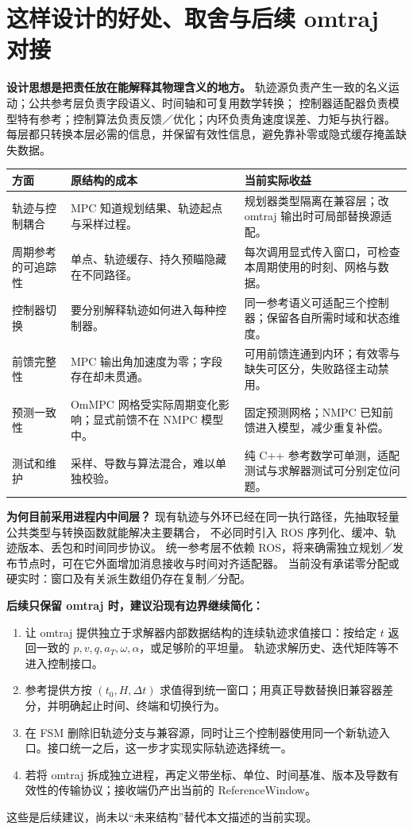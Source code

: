 \documentclass[UTF8,a4paper,11pt,fontset=fandol]{ctexart}
\begin{document}
\section{这样设计的好处、取舍与后续 omtraj 对接}
\label{sec:benefits}
\textbf{设计思想是把责任放在能解释其物理含义的地方。}
轨迹源负责产生一致的名义运动；公共参考层负责字段语义、时间轴和可复用数学转换；
控制器适配器负责模型特有参考；控制算法负责反馈／优化；内环负责角速度误差、力矩与执行器。
每层都只转换本层必需的信息，并保留有效性信息，避免靠补零或隐式缓存掩盖缺失数据。

\begin{table}[h!]
\centering\small
\begin{tabularx}{\linewidth}{L{3cm}Y Y}
\toprule
方面 & 原结构的成本 & 当前实际收益 \\\midrule
轨迹与控制耦合 & MPC 知道规划结果、轨迹起点与采样过程。 & 规划器类型隔离在兼容层；改 omtraj 输出时可局部替换源适配。\\
周期参考的可追踪性 & 单点、轨迹缓存、持久预瞄隐藏在不同路径。 & 每次调用显式传入窗口，可检查本周期使用的时刻、网格与数据。\\
控制器切换 & 要分别解释轨迹如何进入每种控制器。 & 同一参考语义可适配三个控制器；保留各自所需时域和状态维度。\\
前馈完整性 & MPC 输出角加速度为零；字段存在却未贯通。 & 可用前馈连通到内环；有效零与缺失可区分，失败路径主动禁用。\\
预测一致性 & OmMPC 网格受实际周期变化影响；显式前馈不在 NMPC 模型中。 & 固定预测网格；NMPC 已知前馈进入模型，减少重复补偿。\\
测试和维护 & 采样、导数与算法混合，难以单独校验。 & 纯 C++ 参考数学可单测，适配测试与求解器测试可分别定位问题。\\
\bottomrule
\end{tabularx}
\end{table}

\textbf{为何目前采用进程内中间层？}
现有轨迹与外环已经在同一执行路径，先抽取轻量公共类型与转换函数就能解决主要耦合，
不必同时引入 ROS 序列化、缓冲、轨迹版本、丢包和时间同步协议。
统一参考层不依赖 ROS，将来确需独立规划／发布节点时，可在它外面增加消息接收与时间对齐适配器。
当前没有承诺零分配或硬实时：窗口及有关派生数组仍存在复制／分配。

\textbf{后续只保留 omtraj 时，建议沿现有边界继续简化：}
\begin{enumerate}
\item 让 omtraj 提供独立于求解器内部数据结构的连续轨迹求值接口：按给定 $t$ 返回一致的 $p,v,q,a_T,\omega,\alpha$，或足够阶的平坦量。
轨迹求解历史、迭代矩阵等不进入控制接口。
\item 参考提供方按 $(t_0,H,\Delta t)$ 求值得到统一窗口；用真正导数替换旧兼容器差分，并明确起止时间、终端和切换行为。
\item 在 FSM 删除旧轨迹分支与兼容源，同时让三个控制器使用同一个新轨迹入口。接口统一之后，这一步才实现实际轨迹选择统一。
\item 若将 omtraj 拆成独立进程，再定义带坐标、单位、时间基准、版本及导数有效性的传输协议；接收端仍产出当前的 ReferenceWindow。
\end{enumerate}
这些是后续建议，尚未以“未来结构”替代本文描述的当前实现。
\clearpage
\end{document}
